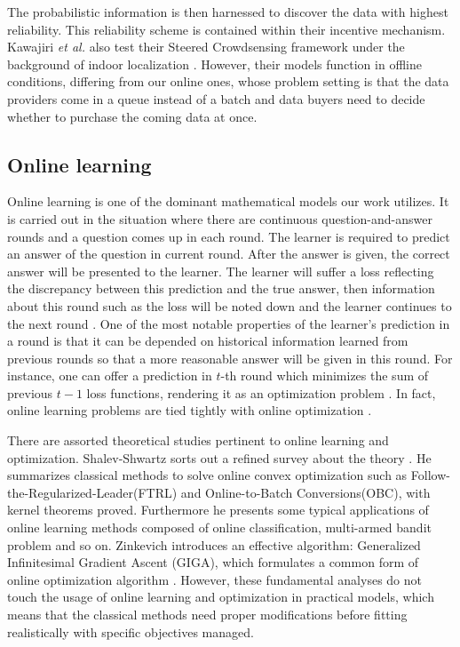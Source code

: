 \documentclass[10pt,conference,compsocconf,letterpaper]{IEEEtran}
\begin{document}
The probabilistic information is then harnessed to discover the data with highest reliability. This reliability scheme is contained within their incentive mechanism. Kawajiri \emph{et al.} also test their Steered Crowdsensing framework under the background of indoor localization \cite{Kawajiri2014Steered}. However, their models function in offline conditions, differing from our online ones, whose problem setting is that the data providers come in a queue instead of a batch and data buyers need to decide whether to purchase the coming data at once.

\subsection{Online learning}

Online learning is one of the dominant mathematical models our work utilizes. It is carried out in the situation where there are continuous question-and-answer rounds and a question comes up in each round. The learner is required to predict an answer of the question in current round. After the answer is given, the correct answer will be presented to the learner. The learner will suffer a loss reflecting the discrepancy between this prediction and the true answer, then information about this round such as the loss will be noted down and the learner continues to the next round \cite{shalev2011online}. One of the most notable properties of the learner’s prediction in a round is that it can be depended on historical information learned from previous rounds so that a more reasonable answer will be given in this round. For instance, one can offer a prediction in $t$-th round which minimizes the sum of previous $t-1$ loss functions, rendering it as an optimization problem \cite{abernethy2015low}. In fact, online learning problems are tied tightly with online optimization \cite{shalev2011online}.

There are assorted theoretical studies pertinent to online learning and optimization. Shalev-Shwartz sorts out a refined survey about the theory \cite{shalev2011online}. He summarizes classical methods to solve online convex optimization such as Follow-the-Regularized-Leader(FTRL) and Online-to-Batch Conversions(OBC), with kernel theorems proved. Furthermore he presents some typical applications of online learning methods composed of online classification, multi-armed bandit problem and so on. Zinkevich introduces an effective algorithm: Generalized Infinitesimal Gradient Ascent (GIGA), which formulates a common form of online optimization algorithm \cite{zinkevich2003online}. However, these fundamental analyses do not touch the usage of online learning and optimization in practical models, which means that the classical methods need proper modifications before fitting realistically with specific objectives managed. %
\end{document}
